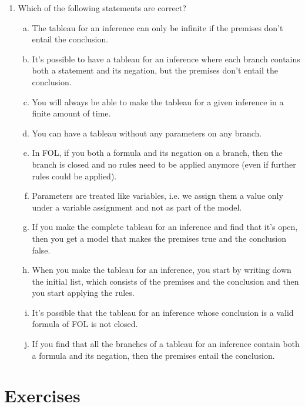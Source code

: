 \begin{enumerate}[\thesection.1]
  \item Which of the following statements are correct?
	\begin{enumerate}[(a)]
	  \item The tableau for an inference can only be infinite if the premises don't entail the conclusion.

	  \item It's possible to have a tableau for an inference where each branch contains both a statement and its negation, but the premises don't entail the conclusion.

	  \item You will always be able to make the tableau for a given inference in a finite amount of time.

	  \item You can have a tableau without any parameters on any branch.

	  \item In FOL, if you both a formula and its negation on a branch, then the branch is closed and no rules need to be applied anymore (even if further rules could be applied).

	  \item Parameters are treated like variables, i.e. we assign them a value only under a variable assignment and not as part of the model.

	  \item If you make the complete tableau for an inference and find that it's open, then you get a model that makes the premises true and the conclusion false.

	  \item When you make the tableau for an inference, you start by writing down the initial list, which consists of the premises and the conclusion and then you start applying the rules.

	  \item It's possible that the tableau for an inference whose conclusion is a valid formula of FOL is not closed.

	  \item If you find that all the branches of a tableau for an inference contain both a formula and its negation, then the premises entail the conclusion.
\end{enumerate}
\end{enumerate}

\section{Exercises}
	
